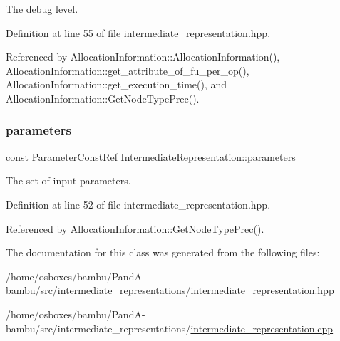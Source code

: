 The debug level. 



Definition at line 55 of file intermediate\+\_\+representation.\+hpp.



Referenced by Allocation\+Information\+::\+Allocation\+Information(), Allocation\+Information\+::get\+\_\+attribute\+\_\+of\+\_\+fu\+\_\+per\+\_\+op(), Allocation\+Information\+::get\+\_\+execution\+\_\+time(), and Allocation\+Information\+::\+Get\+Node\+Type\+Prec().

\mbox{\label{classIntermediateRepresentation_a1dec82655a3ccf5023a1d3bb9805ce8c}} 
\subsubsection{\texorpdfstring{parameters}{parameters}}
{\footnotesize\ttfamily const \hyperlink{Parameter_8hpp_a37841774a6fcb479b597fdf8955eb4ea}{Parameter\+Const\+Ref} Intermediate\+Representation\+::parameters\hspace{0.3cm}{\ttfamily [protected]}}



The set of input parameters. 



Definition at line 52 of file intermediate\+\_\+representation.\+hpp.



Referenced by Allocation\+Information\+::\+Get\+Node\+Type\+Prec().



The documentation for this class was generated from the following files\+:\begin{DoxyCompactItemize}
\item 
/home/osboxes/bambu/\+Pand\+A-\/bambu/src/intermediate\+\_\+representations/\hyperlink{intermediate__representation_8hpp}{intermediate\+\_\+representation.\+hpp}\item 
/home/osboxes/bambu/\+Pand\+A-\/bambu/src/intermediate\+\_\+representations/\hyperlink{intermediate__representation_8cpp}{intermediate\+\_\+representation.\+cpp}\end{DoxyCompactItemize}
